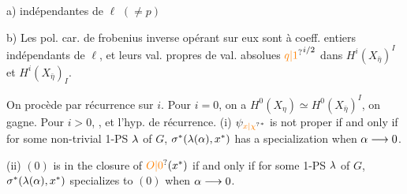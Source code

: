 a)  indépendantes de $\ell$ $(\neq p)$

b) Les pol. car. de frobenius inverse opérant sur eux sont à coeff. entiers indépendants de $\ell$, et leurs val. propres  de val. absolues ${\unsure{q|1}}^{i/2}$ dans $H^i(X_{\bar\eta})^I$ et $H^i(X_{\bar\eta})_I$.


On procède par récurrence sur $i$. Pour $i=0$, on a $H^0(X_\eta)\simeq H^0(X_{\bar\eta})^I$, on gagne. Pour $i>0$,    ,  et l'hyp. de récurrence.
(i) $\handwritten{\psi_{{\unsure{x|\chi}}^*}}$ is not proper if and only if for some non-trivial 1-PS $\lambda$ of $G$, $\sigma^*(\lambda(\alpha),x^*)$ has a specialization when $\alpha\longrightarrow0$.

(ii) $(0)$ is in the closure of $\unsure{O|0}(x^*)$ if and only if for some 1-PS $\lambda$ of $G$, $\sigma^*(\lambda(\alpha),x^*)$ specializes to $(0)$ when $\alpha\longrightarrow0$.

